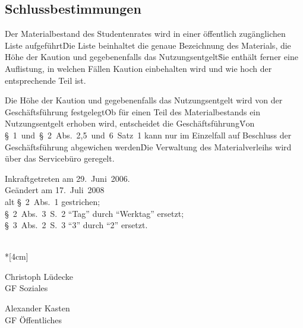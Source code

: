 \begin{multicols}{2}
\section{Schlussbestimmungen}

\Abs \Satz Der Materialbestand des Studentenrates wird in einer öffentlich zugänglichen Liste aufgeführt\. Die Liste beinhaltet die genaue Bezeichnung des Materials, die Höhe der Kaution und gegebenenfalls das Nutzungsentgelt\. Sie enthält ferner eine Auflistung, in welchen Fällen Kaution einbehalten wird und wie hoch der entsprechende Teil ist.

\Abs \Satz Die Höhe der Kaution und gegebenenfalls das Nutzungsentgelt wird von der Geschäftsführung festgelegt\. Ob für einen Teil des Materialbestands ein Nutzungsentgelt erhoben wird, entscheidet die Geschäftsführung\. Von §~1~und~§~2~Abs.~2,5~und~6~Satz~1 kann nur im Einzelfall auf Beschluss der Geschäftsführung abgewichen werden\. Die Verwaltung des Materialverleihs wird über das Servicebüro geregelt.

\end{multicols}

\nopagebreak
\vspace{1cm}
Inkraftgetreten am 29.~Juni~2006.
\\


\footnotesize
Geändert am 17.~Juli~2008\\
alt §~2~Abs.~1 gestrichen;\\
§~2~Abs.~3~S.~2 "`Tag"' durch "`Werktag"' ersetzt;\\
§~3~Abs.~2~S.~3 "`3"' durch "`2"' ersetzt.


\normalsize
~\\*[4cm]
\begin{center}
\hspace*{\fill}
\parbox{7cm}{Christoph Lüdecke\\GF Soziales}
\hfill\parbox{7cm}{Alexander Kasten\\GF Öffentliches}
\hspace*{\fill}
\end{center}